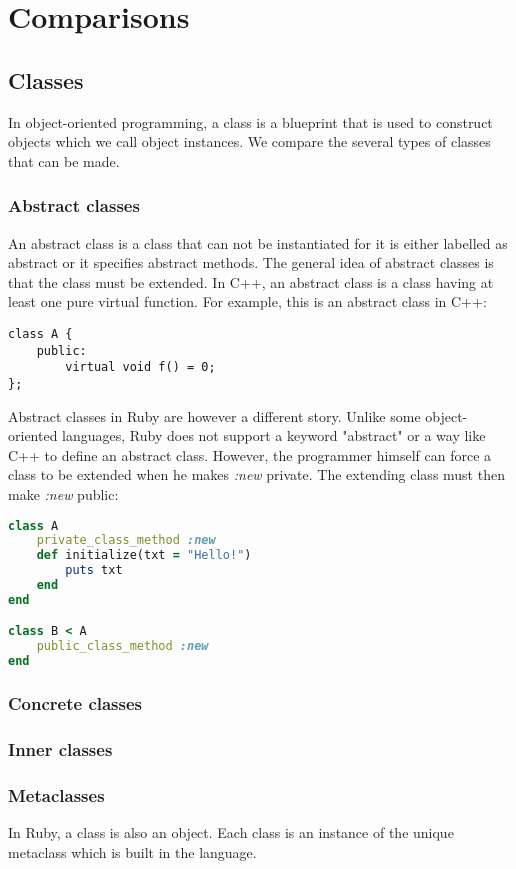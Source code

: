 \documentclass[10pt,a4paper,twocolumn]{article}
\begin{document}
\section{Comparisons}

\subsection{Classes}
In object-oriented programming, a class is a blueprint that is used to construct objects which we call object instances. We compare the several types of classes that can be made.

\subsubsection{Abstract classes}
An abstract class is a class that can not be instantiated for it is either labelled as abstract or it specifies abstract methods. The general idea of abstract classes is that the class must be extended. In C++, an abstract class is a class having at least one pure virtual function. For example, this is an abstract class in C++:
\begin{lstlisting}
class A {
	public:
		virtual void f() = 0;
};
\end{lstlisting}

Abstract classes in Ruby are however a different story. Unlike some object-oriented languages, Ruby does not support a keyword "abstract" or a way like C++ to define an abstract class. However, the programmer himself can force a class to be extended when he makes \textit{:new} private. The extending class must then make \textit{:new} public:
\begin{lstlisting}[language=Ruby]
class A
	private_class_method :new
	def initialize(txt = "Hello!")
		puts txt
	end
end

class B < A
	public_class_method :new
end
\end{lstlisting}

\subsubsection{Concrete classes}

\subsubsection{Inner classes}

\subsubsection{Metaclasses}
In Ruby, a class is also an object. Each class is an instance of the unique metaclass which is built in the language.
\end{document}
